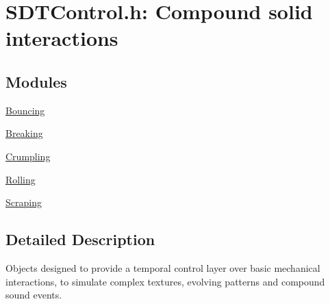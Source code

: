 \hypertarget{group__control}{}\section{S\+D\+T\+Control.\+h\+: Compound solid interactions}
\label{group__control}
\subsection*{Modules}
\begin{DoxyCompactItemize}
\item 
\hyperlink{group__bouncing}{Bouncing}
\item 
\hyperlink{group__breaking}{Breaking}
\item 
\hyperlink{group__crumpling}{Crumpling}
\item 
\hyperlink{group__rolling}{Rolling}
\item 
\hyperlink{group__scraping}{Scraping}
\end{DoxyCompactItemize}


\subsection{Detailed Description}
Objects designed to provide a temporal control layer over basic mechanical interactions, to simulate complex textures, evolving patterns and compound sound events. 